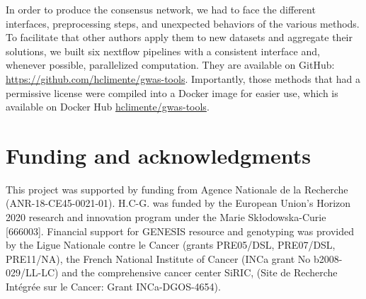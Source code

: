 \documentclass[twocolumn, 10pt]{article}
\begin{document}
In order to produce the consensus network, we had to face the different interfaces, preprocessing steps, and unexpected behaviors of the various methods. To facilitate that other authors apply them to new datasets and aggregate their solutions, we built six nextflow pipelines \cite{di_tommaso_nextflow_2017} with a consistent interface and, whenever possible, parallelized computation. They are available on GitHub: \url{https://github.com/hclimente/gwas-tools}. Importantly, those methods that had a permissive license were compiled into a Docker image for easier use, which is available on Docker Hub \href{https://hub.docker.com/r/hclimente/gwas-tools}{hclimente/gwas-tools}.

\section*{Funding and acknowledgments}

This project was supported by funding from Agence Nationale de la Recherche (ANR-18-CE45-0021-01). H.C-G. was funded by the European Union’s Horizon 2020 research and innovation program under the Marie Skłodowska-Curie [666003]. Financial support for GENESIS resource and genotyping was provided by the Ligue Nationale contre le Cancer (grants PRE05/DSL, PRE07/DSL, PRE11/NA), the French National Institute of Cancer (INCa grant No b2008-029/LL-LC) and the comprehensive cancer center SiRIC, (Site de Recherche Intégrée sur le Cancer: Grant INCa-DGOS-4654).
\end{document}
